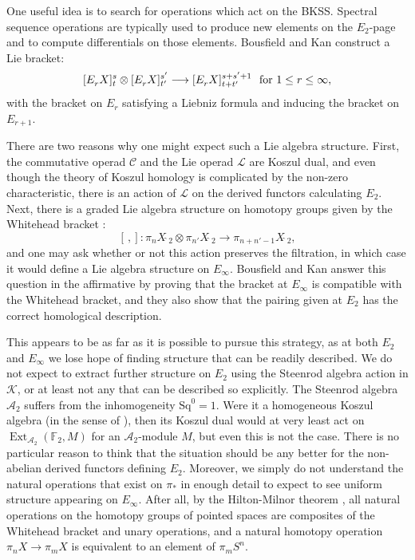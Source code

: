 \documentclass[11pt]{amsart} \renewcommand{\baselinestretch}{1.2}
\theoremstyle{plain}
\numberwithin{equation}{section} %
\theoremstyle{plain}
\numberwithin{equation}{chapter} %
\DeclareMathOperator{\Ext}{Ext}
\renewcommand{\to}{\longrightarrow}
\newcommand{\scrL}{\mathscr{L}}
\newcommand{\scrC}{\mathscr{C}}
\newcommand{\calK}{\mathcal{K}}
\newcommand{\cala}{\mathcal{A}}
\newcommand{\citeBOX}[2][]{\cite[\mbox{#1}]{#2}}
\newcommand{\LieOperad}{{\scrL}}
\newcommand{\CommOperad}{{\scrC}}
\newcommand{\Sq}{\mathrm{Sq}}
\newcommand{\F}{\mathbb{F}}
\newcommand{\Ftwo}{\F_2}
\newcommand{\E}[5]{[E^{#1}_{#2}#3]^{#4}_{#5}}
\newcommand{\BKSS}{BKSS}
\begin{document}
\begin{Introduction}
One useful idea is to search for operations which act on the \BKSS. Spectral sequence operations are typically used to produce new elements on the $E_2$-page and to compute differentials on those elements. Bousfield and Kan \cite[\S14]{BK_pairings_products.pdf} construct a Lie bracket:
\[\E{}{r}{X}{s}{t} \otimes \E{}{r}{X}{s'}{t'}\to \E{}{r}{X}{s+s'+1}{t+t'}\textup{ \ for $1\leq r\leq \infty$},\]
with the bracket on $E_r$ satisfying  a Liebniz formula and inducing the bracket on $E_{r+1}$.

There are two reasons why one might expect such a Lie algebra structure. %
First, the commutative operad $\CommOperad$ and the Lie operad $\LieOperad$ are Koszul dual, and even though the theory of Koszul homology is complicated by the non-zero characteristic, there is an action of $\LieOperad$ on the derived functors calculating $E_2$. %
Next, there is a graded Lie algebra structure on homotopy groups given by the Whitehead bracket \cite{MR0004123}:
\[[\,,]:\pi_nX\hat{\ }_{\!\!\!2}\otimes \pi_{n'}X\hat{\ }_{\!\!\!2}\to \pi_{n+n'-1}X\hat{\ }_{\!\!\!2},\]
and one may ask whether or not this action preserves the filtration, in which case it would define a Lie algebra structure on $E_\infty$.
Bousfield and Kan answer this question in the affirmative by proving that the bracket at $E_\infty$ is compatible with the Whitehead bracket, and they also show that the pairing given at $E_2$ has the correct homological description.

This appears to be as far as it is possible to pursue this strategy, as at both $E_2$ and $E_\infty$ we lose hope of finding structure that can be readily described. %
We do not expect to extract further structure on $E_2$ using the Steenrod algebra action in $\calK$, or at least not any that can be described so explicitly. The Steenrod algebra $\cala_2$ suffers from the inhomogeneity $\Sq^0=1$. Were it a homogeneous Koszul algebra (in the sense of \cite{PriddyKoszul.pdf}), then its Koszul dual would at very least act on $\Ext_{\cala_2}(\Ftwo,M)$ for an $\cala_2$-module $M$, but even this is not the case. 
There is no particular reason to think that the situation should be any better for the non-abelian derived functors defining $E_2$.
Moreover, we simply do not understand the natural operations that exist on $\pi_*$ in enough detail to expect to see uniform structure appearing on $E_\infty$. After all, by the Hilton-Milnor theorem \citeBOX[\S4]{Neisendorfer.pdf}, all natural operations on the homotopy groups of pointed spaces are composites of the Whitehead bracket and unary operations, and a natural  homotopy operation $\pi_n X\to \pi_m X$ is equivalent to an element of $\pi_m S^n$.




\end{Introduction}
\end{document}
